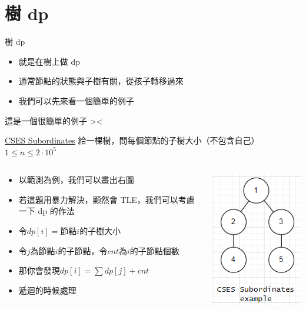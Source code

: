 \documentclass[aspectratio=169]{beamer}
\begin{document}
    \section{樹 dp}
    \begin{frame}{樹 dp}
        \begin{itemize}
            \item 就是在樹上做 dp
            \item 通常節點的狀態與子樹有關，從孩子轉移過來
            \item 我們可以先來看一個簡單的例子
        \end{itemize}
    \end{frame}
    
    \begin{frame}{這是一個很簡單的例子 ><}
        \begin{block}{\href{https://cses.fi/problemset/task/1674/}{CSES Subordinates}}
        給一棵樹，問每個節點的子樹大小（不包含自己）\\
        $1\leq n \leq 2 \cdot 10^5$
        \end{block}
        \begin{columns}
            \begin{column}{0.8\textwidth}
                \begin{itemize}
                    \item 以範測為例，我們可以畫出右圖
                    \item<2-> 若這題用暴力解決，顯然會 TLE，我們可以考慮一下 dp 的作法
                    \item<3-> 令$dp[i]=$節點$i$的子樹大小
                    \item<4-> 令$j$為節點$i$的子節點，令$cnt$為$i$的子節點個數
                    \item<5-> 那你會發現$dp[i]= \sum dp[j]+cnt$
                    \item<5-> 遞迴的時候處理
                \end{itemize}
            \end{column}
            \begin{column}{0.25\textwidth}
                \begin{center}
                    \includegraphics[scale=0.8]{images/CSES_Subordinates_example.png}
                \end{center}
            \end{column}
        \end{columns}
    \end{frame}
    
\end{document}
